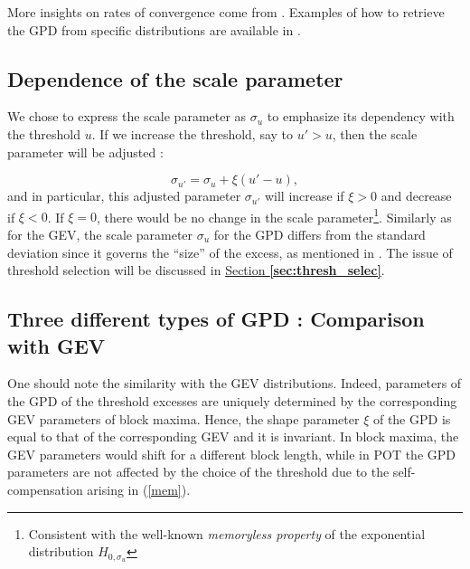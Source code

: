 More insights on rates of convergence come from \citet[pp.27-28]{reiss_statistical_2007}. Examples of how to retrieve the GPD from specific distributions are available in \citet[pp.77]{coles_introduction_2001}.


\subsection{Dependence of the scale parameter } We chose to express the scale parameter as $\sigma_u$ to emphasize its dependency with the threshold $u$. If we increase the threshold, say to $u'>u$, then the scale parameter will be adjusted :

\begin{equation} \label{mem}
\sigma_{u'}=\sigma_u+\xi (u'-u),
\end{equation}
and in particular, this adjusted parameter $\sigma_{u'}$ will increase if $\xi>0$ and decrease if $\xi<0$.
If $\xi =0$, there would be no change in the scale parameter\footnote{Consistent with the well-known \emph{memoryless property} of the exponential distribution $H_{0,\sigma_u}$}. 
Similarly as for the GEV, the scale parameter $\sigma_u$ for the GPD differs from the standard deviation since it governs the “size” of the excess, as mentioned in \citet[pp.20]{aghakouchak_extremes_2012}.
The issue of threshold selection will be discussed in \hyperref[sec:thresh_selec]{Section \textbf{\ref{sec:thresh_selec}}}.



\subsection{Three different types of GPD : Comparison with GEV} 
One should note the similarity with the GEV distributions. Indeed, parameters of the GPD of the threshold excesses are uniquely determined by the corresponding GEV parameters of block maxima. Hence, the shape parameter $\xi$ of the GPD is equal to that of the corresponding GEV and it is invariant.
In block maxima, the GEV parameters would shift for a different block length, while in POT the GPD parameters are not affected by the choice of the threshold due to the self-compensation arising in (\ref{mem}).%


